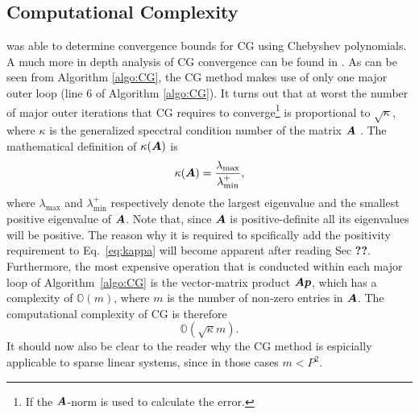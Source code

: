 \documentclass[useAMS,usenatbib]{mn2e}
\newcommand{\bA}{\bmath{A}}
\newcommand{\bp}{\bmath{p}}
\begin{document}
\subsection{Computational Complexity}
\citet{Kaniel1966} was able to determine convergence bounds for CG using Chebyshev polynomials. A much more in depth analysis of CG convergence can be found in
\citep{Sluis1986}. As can be seen from Algorithm \ref{algo:CG}, the CG method makes use of only one major outer loop (line 6 of Algorithm \ref{algo:CG}). It turns out that at worst 
the number of major outer iterations that CG requires to converge\footnote{If the $\bA$-norm is used to calculate the error.} is proportional to $\sqrt{\kappa}$, where $\kappa$ is the generalized specctral condition number of the matrix $\bA$ \citep{Lu2015}.
The mathematical definition of $\kappa(\bA)$ is
\begin{equation}
\label{eq:kappa}
\kappa(\bA) = \frac{\lambda_{\textrm{max}}}{\lambda^{+}_{\textrm{min}}}, 
\end{equation}
where $\lambda_{\textrm{max}}$ and $\lambda^{+}_{\textrm{min}}$ respectively denote the largest eigenvalue and the smallest positive eigenvalue of $\bA$.
Note that, since $\bA$ is positive-definite all its eigenvalues will be positive. The reason why it is required to spcifically add the positivity requirement to Eq.~\eqref{eq:kappa} will become
apparent after reading Sec \textbf{??}. Furthermore, the most expensive operation that is conducted within each major loop of Algorithm~\ref{algo:CG} is the vector-matrix product $\bA\bp$, which has a complexity of $\mathbb{O}(m)$, where $m$ is the number of non-zero entries in $\bA$.
The computational complexity of CG is therefore 
\begin{equation}
\label{eq:cg_bound}
\mathbb{O}(\sqrt{\kappa}m). 
\end{equation}
It should now also be clear to the reader why the CG method is espicially applicable to sparse linear systems, since in those cases $m < P^2$.
\end{document}

